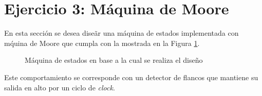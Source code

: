 \section{Ejercicio 3: M\'aquina de Moore}
En esta secci\'on se desea dise\~ar una m\'aquina de estados implementada con m\'quina de Moore que cumpla con la mostrada en la Figura \ref{fig:TARGET}.
\begin{figure}[H]
    \centering
    \caption{M\'aquina de estados en base a la cual se realiza el dise\~no}
    \label{fig:TARGET}
\end{figure}
Este comportamiento se corresponde con un detector de flancos que mantiene su salida en alto por un ciclo de \textit{clock}.
